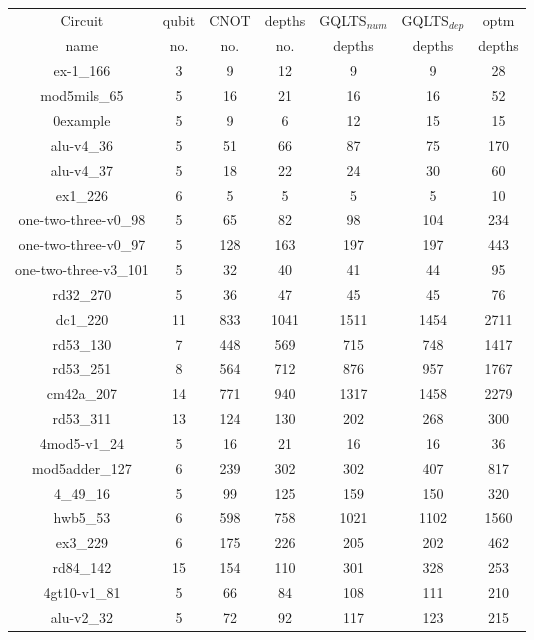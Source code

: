 \documentclass[runningheads]{llncs}
\begin{document}
						\begin{table}[H]
							\begin{center}  
							\begin{tabular}{|c|c|c|c|c|c|c|}
							\hline
							Circuit &  qubit  & CNOT &depths &GQLTS$_{num}$& GQLTS$_{dep}$  & optm 	  	\\
							 name	&   no. 	&	no. & no. & depths&  depths &  depths 	\\
							\hline
							ex-1\_166 & 3 & 9 & 12 & 9 & 9 & 28 \\
							mod5mils\_65 & 5 & 16 & 21 & 16 & 16 & 52 \\
							0example & 5 & 9 & 6 & 12 & 15 & 15 \\
							alu-v4\_36 & 5 & 51 & 66 & 87 & 75 & 170 \\
							alu-v4\_37 & 5 & 18 & 22 & 24 & 30 & 60 \\
							ex1\_226 & 6 & 5 & 5 & 5 & 5 & 10 \\
							one-two-three-v0\_98 & 5 & 65 & 82 & 98 & 104 & 234 \\
							one-two-three-v0\_97 & 5 & 128 & 163 & 197 & 197 & 443 \\
							one-two-three-v3\_101 & 5 & 32 & 40 & 41 & 44 & 95 \\
							rd32\_270 & 5 & 36 & 47 & 45 & 45 & 76 \\
							dc1\_220 & 11 & 833 & 1041 & 1511 & 1454 & 2711 \\
							rd53\_130 & 7 & 448 & 569 & 715 & 748 & 1417 \\
							rd53\_251 & 8 & 564 & 712 & 876 & 957 & 1767 \\
							cm42a\_207 & 14 & 771 & 940 & 1317 & 1458 & 2279 \\
							rd53\_311 & 13 & 124 & 130 & 202 & 268 & 300 \\
							4mod5-v1\_24 & 5 & 16 & 21 & 16 & 16 & 36 \\
							mod5adder\_127 & 6 & 239 & 302 & 302 & 407 & 817 \\
							4\_49\_16 & 5 & 99 & 125 & 159 & 150 & 320 \\
							hwb5\_53 & 6 & 598 & 758 & 1021 & 1102 & 1560 \\
							ex3\_229 & 6 & 175 & 226 & 205 & 202 & 462 \\
							rd84\_142 & 15 & 154 & 110 & 301 & 328 & 253 \\
							4gt10-v1\_81 & 5 & 66 & 84 & 108 & 111 & 210 \\
							alu-v2\_32 & 5 & 72 & 92 & 117 & 123 & 215 \\

\end{tabular}
\end{center}
\end{table}
\end{document}
